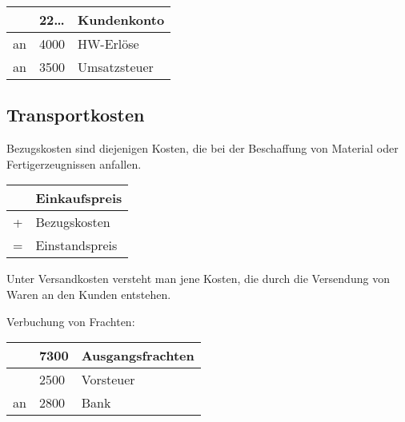 \documentclass[letterpaper,10pt,english]{sphinxmanual}
\begin{document}


\begin{savenotes}\sphinxattablestart
\centering
\begin{tabulary}{\linewidth}[t]{|T|T|T|}
\hline
&
22…
&
Kundenkonto
\\
\hline
an
&
4000
&
HW-Erlöse
\\
\hline
an
&
3500
&
Umsatzsteuer
\\
\hline
\end{tabulary}
\par
\sphinxattableend\end{savenotes}


\subsection{Transportkosten}
\label{\detokenize{pool1:transportkosten}}
\begin{DUlineblock}{0em}
\item[] 
\item[] Bezugskosten sind diejenigen Kosten, die bei der Beschaffung von Material oder Fertigerzeugnissen anfallen.
\end{DUlineblock}


\begin{savenotes}\sphinxattablestart
\centering
\begin{tabulary}{\linewidth}[t]{|T|T|}
\hline
&
Einkaufspreis
\\
\hline
+
&
Bezugskosten
\\
\hline
=
&
Einstandspreis
\\
\hline
\end{tabulary}
\par
\sphinxattableend\end{savenotes}

\begin{DUlineblock}{0em}
\item[] 
\item[] Unter Versandkosten versteht man jene Kosten, die durch die Versendung von Waren an den Kunden entstehen.
\item[] 
\item[] Verbuchung von Frachten:
\end{DUlineblock}


\begin{savenotes}\sphinxattablestart
\centering
\begin{tabulary}{\linewidth}[t]{|T|T|T|}
\hline
&
7300
&
Ausgangsfrachten
\\
\hline&
2500
&
Vorsteuer
\\
\hline
an
&
2800
&
Bank
\\
\hline
\end{tabulary}
\par
\sphinxattableend\end{savenotes}
\end{document}
